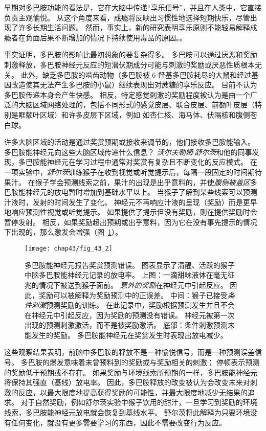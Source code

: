 早期对多巴胺功能的看法是，它在大脑中传递“享乐信号”，并且在人类中，它直接负责主观愉悦。
从这个角度来看，成瘾将反映出习惯性地选择短期快乐，尽管出现了许多长期生活问题。
然而，事实上，新的研究表明享乐原则不能轻易解释成瘾者在负面后果不断增加的情况下持续使用毒品的原因。。


事实证明，多巴胺的影响比最初想象的要复杂得多。
多巴胺可以通过厌恶和奖励刺激释放，多巴胺神经元反应的短潜伏期成分可能与刺激的奖励或厌恶性质根本无关。
此外，缺乏多巴胺的啮齿动物（多巴胺被 6-羟基多巴胺耗尽的大鼠和经过基因改造使其无法产生多巴胺的小鼠）继续表现出对蔗糖的享乐反应。
目前不认为多巴胺传递本身会产生快感。
相反，特定感觉刺激的奖励程度被认为是由一个广泛的大脑区域网络处理的，包括不同形式的感觉皮层、联合皮层、前额叶皮层（特别是眶额叶区域）和许多皮层下区域，例如 如杏仁核、海马体、伏隔核和腹侧苍白球。


许多大脑区域的活动是通过奖赏预期或接收来调节的，他们接收多巴胺能输入。
多巴胺能神经元向这些大脑区域传递什么信息？
\textit{沃尔夫勒姆$\cdot$舒尔茨}和他的同事发现，多巴胺能神经元在学习过程中通常对奖赏有复杂且不断变化的反应模式。
在一项实验中，\textit{舒尔茨}训练猴子在收到视觉或听觉提示后，每隔一段固定的时间期待果汁。
在猴子学会预测线索之前，果汁的出现是出乎意料的，并使\textit{腹侧被盖区}多巴胺能神经元的放电暂时增加到基础水平以上。
当猴子了解到某些线索可以预测汁液时，发射的时间发生了变化。
神经元不再响应汁液的呈现（奖励）而是更早地响应预测性视觉或听觉提示。
如果提供了提示但没有奖励，则在提供奖励时会暂停发射。
相反，如果奖励超出预期或出乎意料，因为它在没有事先提示的情况下出现的，那么激发会增强（图~\ref{fig:43_2}）。


\begin{figure}[htbp]
	\centering
	\texttt{[image: chap43/fig\_43\_2]}
	\caption{多巴胺能神经元报告奖赏预测错误。
		图表显示了清醒、活跃的猴子中脑多巴胺能神经元记录的放电率。
		上图：一滴甜味液体在毫无征兆的情况下被送到猴子面前。
		\textit{意外的奖励}在神经元中引起反应。
		因此，奖励可以被解释为奖励预测中的正误差。
		中间：猴子已接受\textit{条件刺激}预测奖励的训练。
		在此记录中，奖励根据预测发生并且不会在神经元中引起反应，因为奖励的预测没有错误。
		神经元被第一次出现的预测刺激激活，而不是被奖励激活。
		底部：条件刺激预测未能发生的奖励。
		多巴胺能神经元在奖赏发生时表现出放电减少\cite{schultz1997neural}。}
	\label{fig:43_2}
\end{figure}


这些观察结果表明，前脑中多巴胺的释放不是一种愉悦信号，而是一种预测误差信号。
多巴胺的爆发意味着未曾预料到的奖励或与奖励相关的刺激；
停顿表示预测的奖励低于预期或不存在。
如果奖励与环境线索所预期的一样，多巴胺能神经元将保持其强直（基线）放电率。
因此，多巴胺释放的改变被认为会改变未来对刺激的反应，以最大限度地提高获得奖励的可能性，并最大限度地减少无结果的追求。
对于自然奖励，例如舒尔茨实验中猴子饮用的甜汁，一旦学习到奖励的环境线索，多巴胺能神经元放电就会恢复到基线水平。
舒尔茨将此解释为只要环境没有任何变化，就没有更多需要学习的东西，因此不需要改变行为反应。


